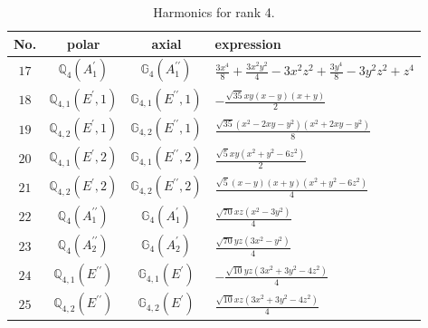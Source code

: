 \documentclass[fleqn,8pt,landscape]{jsarticle}
\begin{document}
\begin{table}[ht!]
\begin{center}
\caption{Harmonics for rank 4.}
\renewcommand{\arraystretch}{1.3}
\begin{tabular}{cccl} \hline \hline
No. & polar & axial & expression \\ \hline
$ 17 $ & $ \mathbb{Q}_{4}(A_{1}^{\prime}) $ & $ \mathbb{G}_{4}(A_{1}^{\prime\prime}) $ & $ \frac{3 x^{4}}{8} + \frac{3 x^{2} y^{2}}{4} - 3 x^{2} z^{2} + \frac{3 y^{4}}{8} - 3 y^{2} z^{2} + z^{4} $ \\
$ 18 $ & $ \mathbb{Q}_{4,1}(E^{\prime},1) $ & $ \mathbb{G}_{4,1}(E^{\prime\prime},1) $ & $ - \frac{\sqrt{35} x y \left(x - y\right) \left(x + y\right)}{2} $ \\
$ 19 $ & $ \mathbb{Q}_{4,2}(E^{\prime},1) $ & $ \mathbb{G}_{4,2}(E^{\prime\prime},1) $ & $ \frac{\sqrt{35} \left(x^{2} - 2 x y - y^{2}\right) \left(x^{2} + 2 x y - y^{2}\right)}{8} $ \\
$ 20 $ & $ \mathbb{Q}_{4,1}(E^{\prime},2) $ & $ \mathbb{G}_{4,1}(E^{\prime\prime},2) $ & $ \frac{\sqrt{5} x y \left(x^{2} + y^{2} - 6 z^{2}\right)}{2} $ \\
$ 21 $ & $ \mathbb{Q}_{4,2}(E^{\prime},2) $ & $ \mathbb{G}_{4,2}(E^{\prime\prime},2) $ & $ \frac{\sqrt{5} \left(x - y\right) \left(x + y\right) \left(x^{2} + y^{2} - 6 z^{2}\right)}{4} $ \\
$ 22 $ & $ \mathbb{Q}_{4}(A_{1}^{\prime\prime}) $ & $ \mathbb{G}_{4}(A_{1}^{\prime}) $ & $ \frac{\sqrt{70} x z \left(x^{2} - 3 y^{2}\right)}{4} $ \\
$ 23 $ & $ \mathbb{Q}_{4}(A_{2}^{\prime\prime}) $ & $ \mathbb{G}_{4}(A_{2}^{\prime}) $ & $ \frac{\sqrt{70} y z \left(3 x^{2} - y^{2}\right)}{4} $ \\
$ 24 $ & $ \mathbb{Q}_{4,1}(E^{\prime\prime}) $ & $ \mathbb{G}_{4,1}(E^{\prime}) $ & $ - \frac{\sqrt{10} y z \left(3 x^{2} + 3 y^{2} - 4 z^{2}\right)}{4} $ \\
$ 25 $ & $ \mathbb{Q}_{4,2}(E^{\prime\prime}) $ & $ \mathbb{G}_{4,2}(E^{\prime}) $ & $ \frac{\sqrt{10} x z \left(3 x^{2} + 3 y^{2} - 4 z^{2}\right)}{4} $ \\
 \hline \hline
\end{tabular}
\end{center}
\end{table}
\end{document}
